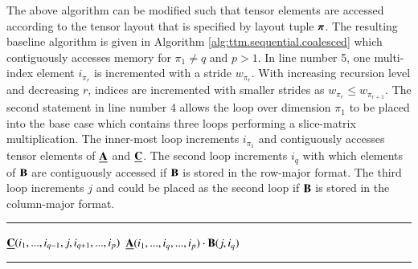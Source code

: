 The above algorithm can be modified such that tensor elements are accessed according to the tensor layout that is specified by layout tuple $\boldsymbol{\pi}$.
The resulting baseline algorithm is given in Algorithm \ref{alg:ttm.sequential.coalesced} which contiguously accesses memory for $\pi_1 \neq q$ and $p > 1$.
In line number 5, one multi-index element $i_{\pi_r}$ is incremented with a stride $w_{\pi_r}$. %
With increasing recursion level and decreasing $r$, indices are incremented with smaller strides as $w_{\pi_r} \leq w_{\pi_{r+1}}$. 
The second  statement in line number 4 allows the loop over dimension $\pi_1$ to be placed into the base case which contains three loops performing a slice-matrix multiplication.
The inner-most loop increments $i_{\pi_1}$ and contiguously accesses tensor elements of $\mubA$ and $\mubC$.
The second loop increments $i_q$ with which elements of $\mathbf{B}$ are contiguously accessed if $\mathbf{B}$ is stored in the row-major format.
The third loop increments $j$ and could be placed as the second loop if $\mathbf{B}$ is stored in the column-major format.

\begin{algorithm}[t]
\DontPrintSemicolon
{}
%
\footnotesize 
\SetAlgoVlined
\hrule
\BlankLine
{}
{
	{
	}
	{
		{
			\;
		}		
	}	
	\Else%
	{
		{
			{			
				{
					$\underline{\mathbf{C}}(i_1,...,i_{q-1},j,i_{q+1},...,i_{p})$ \ttt{+=} $\underline{\mathbf{A}}(i_1,...,i_q,...,i_p) \cdot \mathbf{B}(j,i_q)$\;
				}
			}
		}
	}
}
\BlankLine
\hrule
\caption{
\footnotesize %
Modified baseline algorithm with contiguous memory access for the tensor-matrix multiplication.
The tensor order $p$ must be greater than $1$ and the contraction mode $q$ must satisfy $1 \leq q \leq p$ and $\pi_1 \neq q$.
The initial call must happen with $r=p$ where $\mbn$ is the shape tuple of $\mubA$ and $m$ is the $q$-th dimension of $\mubC$. 
\label{alg:ttm.sequential.coalesced}
}
\end{algorithm}

